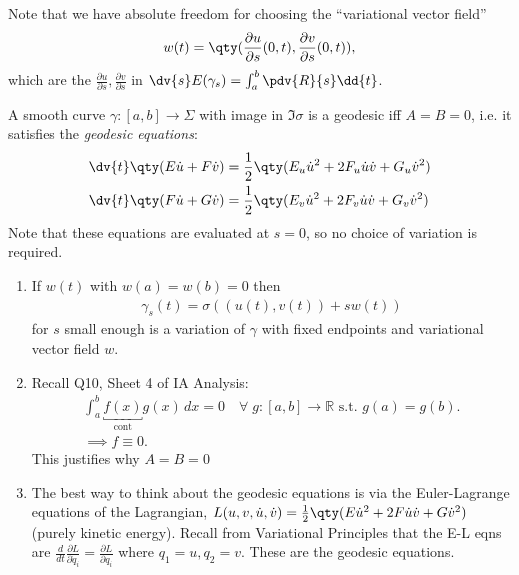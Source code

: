 Note that we have absolute freedom for choosing the ``variational vector field''
\begin{align*}
	w(t) = \qty(\frac{\partial u}{\partial s}(0, t), \frac{\partial v}{\partial s}(0, t)),
\end{align*} which are the $\frac{\partial u}{\partial s}, \frac{\partial v}{\partial s}$ in $\dv{s} E(\gamma_s) = \int_a^b \pdv{R}{s} \dd{t}$.

\begin{corollary}
	A smooth curve $\gamma \colon [a,b] \to \Sigma$ with image in $\Im \sigma$ is a geodesic iff $A = B = 0$, i.e. it satisfies the \textit{geodesic equations}:
	\begin{align*}
		\dv{t} \qty(E \dot u + F \dot v) & = \frac{1}{2} \qty( E_u \dot u^2 + 2F_u \dot u \dot v + G_u \dot v^2 ) \\
		\dv{t} \qty(F \dot u + G \dot v) & = \frac{1}{2} \qty( E_v \dot u^2 + 2F_v \dot u \dot v + G_v \dot v^2 )
	\end{align*}
	Note that these equations are evaluated at $s = 0$, so no choice of variation is required.
\end{corollary}

\begin{remark}
	\begin{enumerate}
		\item If $w(t)$ with $w(a) = w(b) = 0$ then 
		\begin{align*}
			\gamma_s(t) = \sigma((u(t), v(t)) + sw(t))
		\end{align*} 
		for $s$ small enough is a variation of $\gamma$ with fixed endpoints and variational vector field $w$.
		\item Recall Q10, Sheet 4 of IA Analysis:
		\begin{gather*}
			\int_a^b \underbracket{f(x)}_{\text{cont}} g(x) \,dx = 0 \quad \forall \; g : [a, b] \to \mathbb{R} \text{ s.t. } g(a) = g(b). \\
			\implies f \equiv 0.
		\end{gather*} 
		This justifies why $A = B = 0$
		\item  The best way to think about the geodesic equations is via the Euler-Lagrange equations of the Lagrangian, $L(u, v, \dot{u}, \dot{v}) = \frac{1}{2} \qty(E \dot{u}^2 + 2 F \dot{u} \dot{v} + G \dot{v}^2)$ (purely kinetic energy).
		Recall from Variational Principles that the E-L eqns are $\frac{d }{d t} \frac{\partial L}{\partial \dot{q}_i} = \frac{\partial L}{\partial q_i}$ where $q_1 = u, q_2 = v$.
		These are the geodesic equations.
	\end{enumerate} 
\end{remark} 


